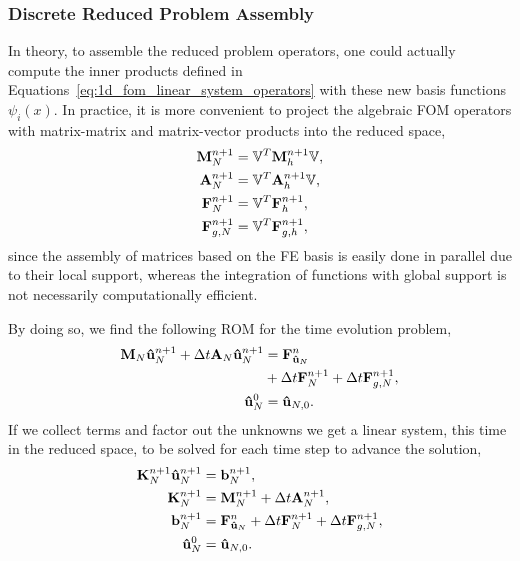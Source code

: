 \documentclass[../../1_heat_equation.tex]{subfiles}
\newcommand{\rbV}{\ensuremath{\mathbb{V}}}
\newcommand{\rbVT}{\ensuremath{\rbV^T}}
\begin{document}
\subsubsection{Discrete Reduced Problem Assembly}
In theory, to assemble the reduced problem operators, one could actually compute the inner products defined in Equations~\eqref{eq:1d_fom_linear_system_operators} with these new basis functions $\psi_i(x)$.
In practice, it is more convenient to project the algebraic FOM operators with matrix-matrix and matrix-vector products into the reduced space, 
\begin{subequations}
    \label{eq:1d_rom_linear_system_operators}
    \begin{align}
        \vb{M}_{N}^{n+1} &= \rbVT \vb{M}_{h}^{n+1} \rbV, \\
        \vb{A}_{N}^{n+1} &= \rbVT \vb{A}_{h}^{n+1} \rbV, \\
        \vb{F}_{N}^{n+1} &= \rbVT \vb{F}_{h}^{n+1},  \\
        \vb{F}_{{g,N}}^{n+1} &= \rbVT \vb{F}_{{g,h}}^{n+1},
    \end{align}
\end{subequations}
since the assembly of matrices based on the FE basis is easily done in parallel due to their local support, 
whereas the integration of functions with global support is not necessarily computationally efficient.

By doing so, we find the following ROM for the time evolution problem,
\begin{subequations}
    \label{eq:1d_rom_weak_formulation_discrete}
    \begin{align}
        \vb{M}_N \vb{\hat{u}}_{N}^{n+1} + \Delta t \vb{A}_N \vb{\hat{u}}_{N}^{n+1} &= \vb{F}^{n}_{\vb{\hat{u}}_N} \\
        &+ \Delta t \vb{F}_N^{n+1} + \Delta t \vb{F}^{n+1}_{g, N}, \nonumber \\
        \vb{\hat{u}}_N^{0} &= \vb{\hat{u}}_{N,0}.
    \end{align}
\end{subequations}
If we collect terms and factor out the unknowns we get a linear system, this time in the reduced space, to be solved for each time step to advance the solution,
\begin{subequations}
    \label{eq:1d_rom_linear_system_timestep}
    \begin{align}
        \vb{K}_N^{n+1} \vb{\hat{u}}_N^{n+1} &= \vb{b}_N^{n+1}, \\
        \vb{K}_N^{n+1} &= \vb{M}_{N}^{n+1} + \Delta t \vb{A}_{N}^{n+1}, \\
        \vb{b}_N^{n+1} &= \vb{F}_{\vb{\hat{u}}_N}^{n} + \Delta t \vb{F}_N^{n+1} + \Delta t \vb{F}_{g,N}^{n+1}, \\
        \vb{\hat{u}}_N^{0} &= \vb{\hat{u}}_{N,0}.
    \end{align}
\end{subequations}
\end{document}

